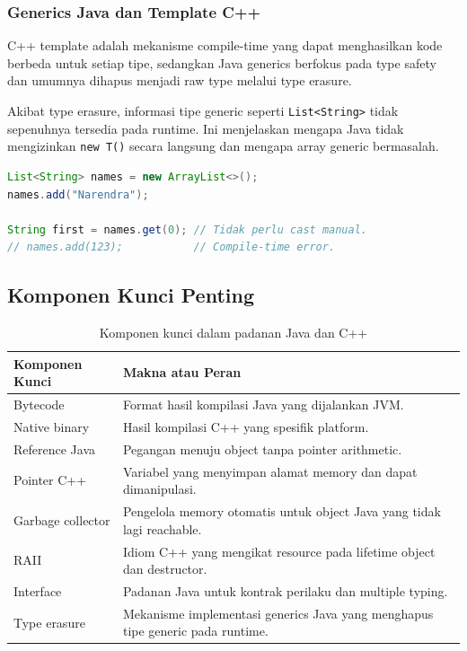 \subsubsection{Generics Java dan Template C++}

\begin{jawab}
C++ template adalah mekanisme compile-time yang dapat menghasilkan kode berbeda untuk setiap tipe, sedangkan Java generics berfokus pada type safety dan umumnya dihapus menjadi raw type melalui type erasure.
\end{jawab}

Akibat type erasure, informasi tipe generic seperti \texttt{List<String>} tidak sepenuhnya tersedia pada runtime. Ini menjelaskan mengapa Java tidak mengizinkan \texttt{new T()} secara langsung dan mengapa array generic bermasalah.

\begin{lstlisting}[language=Java, caption={Generic Java memberi type safety saat kompilasi}, label={lst:java-generics-preview}]
List<String> names = new ArrayList<>();
names.add("Narendra");

String first = names.get(0); // Tidak perlu cast manual.
// names.add(123);           // Compile-time error.
\end{lstlisting}

\subsection{Komponen Kunci Penting}

\begin{table}[H]
\centering
\begin{tabularx}{\textwidth}{|L{0.28\textwidth}|X|}
\hline
\textbf{Komponen Kunci} & \textbf{Makna atau Peran} \\
\hline
Bytecode & Format hasil kompilasi Java yang dijalankan JVM. \\
\hline
Native binary & Hasil kompilasi C++ yang spesifik platform. \\
\hline
Reference Java & Pegangan menuju object tanpa pointer arithmetic. \\
\hline
Pointer C++ & Variabel yang menyimpan alamat memory dan dapat dimanipulasi. \\
\hline
Garbage collector & Pengelola memory otomatis untuk object Java yang tidak lagi reachable. \\
\hline
RAII & Idiom C++ yang mengikat resource pada lifetime object dan destructor. \\
\hline
Interface & Padanan Java untuk kontrak perilaku dan multiple typing. \\
\hline
Type erasure & Mekanisme implementasi generics Java yang menghapus tipe generic pada runtime. \\
\hline
\end{tabularx}
\caption{Komponen kunci dalam padanan Java dan C++}
\label{tab:komponen-kunci-java-cpp}
\end{table}

